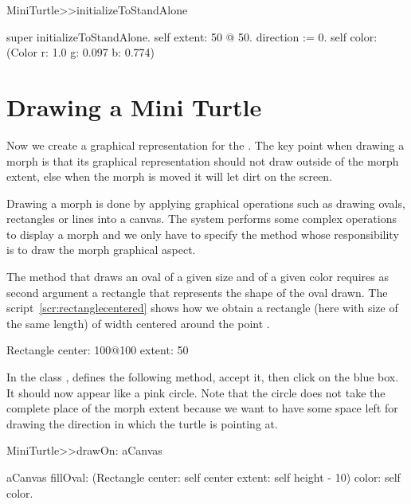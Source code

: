 \begin{method}
MiniTurtle>>initializeToStandAlone

   super initializeToStandAlone.
   self extent: 50 @ 50.
   direction := 0.
   self color: (Color r: 1.0 g: 0.097 b: 0.774)
\end{method}




\section{Drawing a Mini Turtle}
Now we create a graphical representation for the \mt.  The key point
when drawing a morph is that its graphical representation should not
draw outside of the morph extent, else when the morph is moved it will
let dirt on the screen.

Drawing a morph is done by applying graphical operations such as
drawing ovals, rectangles or lines into a canvas. The system performs
some complex operations to display a morph and we only have to specify
the  method whose responsibility is to draw the morph
graphical aspect.

The method  that draws an oval of a
given size and of a given color requires as second argument a
rectangle that represents the shape of the oval drawn. The
script~\ref{scr:rectanglecentered} shows how we obtain a rectangle
(here with size of the same length) of  width centered around
the point .

\begin{scriptwithouttitle}\label{scr:rectanglecentered}
Rectangle center: 100@100 extent: 50
\end{scriptwithouttitle}

In the class \mtc, defines the following method, accept it, then click
on the blue box. It should now appear like a pink circle. Note that
the circle does not take the complete place of the morph extent
because we want to have some space left for drawing the direction in
which the turtle is pointing at. 

\begin{method}
MiniTurtle>>drawOn: aCanvas

   aCanvas
      fillOval: (Rectangle center: self center 
                           extent: self height - 10)
      color: self color.
\end{method}


